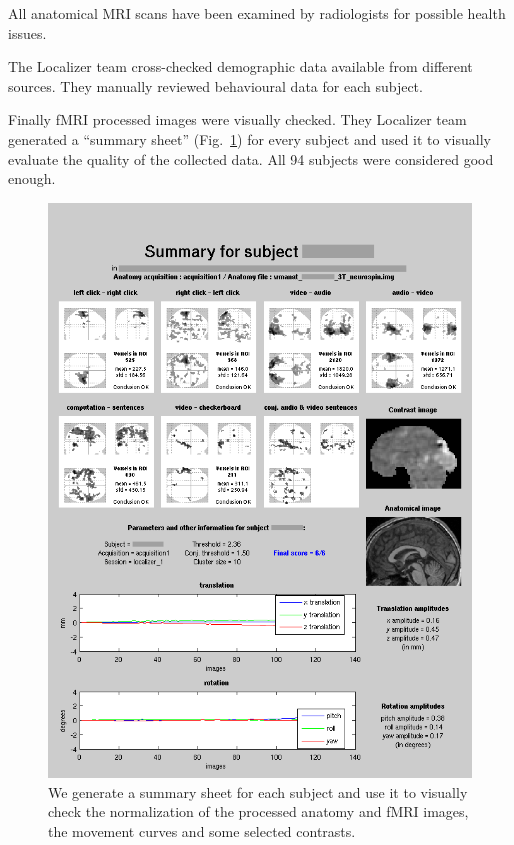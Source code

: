 \documentclass[review]{elsarticle}
\begin{document}
All anatomical MRI scans have been examined by radiologists for possible health issues.

The Localizer team cross-checked demographic data available from different
sources. They manually reviewed behavioural data for each subject.

Finally fMRI processed images were visually checked. They Localizer team
generated a ``summary sheet'' (Fig.~\ref{fig:summary}) for every subject and
used it to visually evaluate the quality of the collected data. All 94 subjects
were considered good enough.

\begin{figure}[ht]
    \centering
    \includegraphics[scale=0.25]{summary}
    \caption{We generate a summary sheet for each subject and use it to
    visually check the normalization of the processed anatomy and fMRI
    images, the movement curves and some selected contrasts.}
    \label{fig:summary}
\end{figure}
\end{document}
